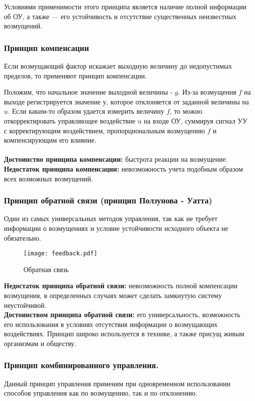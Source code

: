 \documentclass[../../TAU.tex]{subfiles}
\begin{document}
    Условиями применимости этого принципа является наличие полной информации об ОУ, а также --- его устойчивость и отсутствие существенных неизвестных возмущений.

\subsubsection{Принцип компенсации}
    Если возмущающий фактор искажает выходную величину до недопустимых пределов, то применяют принцип компенсации. \par
    Положим, что начальное значение выходной величины - $g$. Из-за возмущения $f$ на выходе регистрируется значение $у$, которое отклоняется от заданной величины на $u$. 
    Если каким-то образом удается измерить величину $f$, то можно откорректировать управляющее воздействие u на входе ОУ, суммируя сигнал УУ с корректирующим воздействием, пропорциональным возмущению $f$ и компенсирующим его влияние.\\\\
    {\bf Достоинство принципа компенсации:} быстрота реакции на возмущение. \\
    {\bf Недостаток принципа компенсации:} невозможность учета подобным образом всех возможных возмущений.

\subsubsection{Принцип обратной связи (принцип Ползунова - Уатта)}
    Один из самых универсальных методов управления, так как не требует информации о возмущениях и условие устойчивости исходного объекта не обязательно.


    \begin{figure}[h]
    \centering
    \texttt{[image: feedback.pdf]}
    \caption{Обратная связь}
    \centering
    \end{figure}

    {\bf Недостаток принципа обратной связи:} невозможность полной компенсации возмущения, в определенных случаях может сделать замкнутую систему неустойчивой. \\
    {\bf Достоинством принципа обратной связи:} его универсальность, возможность его использования в условиях отсутствия информации о возмущающих воздействиях. Принцип широко используется в технике, а также присущ живым организмам и обществу.


\subsubsection{Принцип комбинированного управления.}
    Данный принцип управления применим при одновременном использовании способов управления как по возмущению, так и по отклонению.
\end{document}
